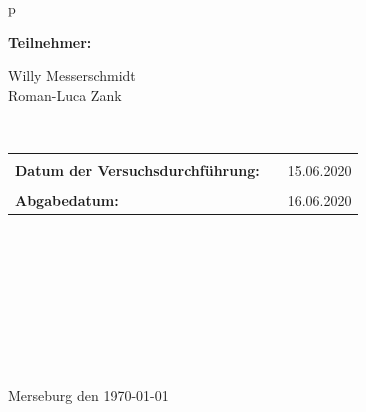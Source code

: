 \begin{center}
\begin{tabular}{p{\textwidth}}

\begin{center}
\Large{\textbf{Teilnehmer:}} \\ 
\end{center}
\begin{center}
\large{Willy Messerschmidt \\
	Roman-Luca Zank} \\
\end{center}


\\

\begin{center}
\begin{tabular}{lll}
&&\\
\large{\textbf{Datum der Versuchsdurchführung:}}&& \large{15.06.2020}\\
&&\\
\large{\textbf{Abgabedatum:}}&& \large{16.06.2020}
\end{tabular}
\end{center}

\\ \\ \\ \\ \\ \\ \\ \\ 
\large{Merseburg den \today}

\end{tabular}
\end{center}
